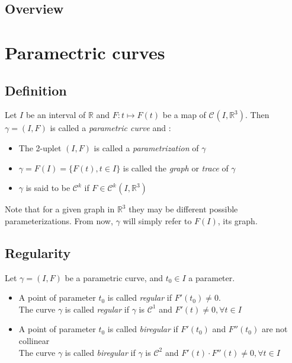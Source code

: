 \citet{Bishop1975}
\citep{Bishop1975}
\citeauthor{Bishop1975}
\citeyear{Bishop1975}

\cite{Bishop1975}
\cite{Bergou2008}
\cite{Hoffmann2008}
\cite{Bluth2014}
\cite{Frenet1852}
\cite{Delcourt2007}
\cite{Farouki2014}
\cite{Guggenheimer1989}
\cite{Klok1986}

\subsection{Overview}



\section{Paramectric curves}

\subsection{Definition}
Let $I$ be an interval of $\mathbb{R}$ and $F\colon t \mapsto F(t)$ be a map of ${\mathcal{C}}^{}(I,{\mathbb{R}}^3)$. Then $\gamma=(I,F)$ is called a \emph{parametric curve} and :
\begin{itemize}
	\item The 2-uplet $(I,F)$ is called a \emph{parametrization} of $\gamma$
	\item $\gamma = F(I) = \{F(t), t \in I\}$ is called the \emph{graph} or \emph{trace} of $\gamma$
	\item $\gamma$ is said to be ${\mathcal{C}}^{k}$ if $F \in {\mathcal{C}^{k}}^{}(I,{\mathbb{R}}^3)$
\end{itemize}

\begin{myrk}
Note that for a given graph in ${\mathbb{R}}^3$ they may be different possible parameterizations. From now, $\gamma$ will simply refer to $F(I)$, its graph.
\end{myrk}

\subsection{Regularity}
Let $\gamma=(I,F)$ be a parametric curve, and $t_0 \in I$ a parameter.
\begin{itemize}
	\item A point of parameter $t_0$ is called \emph{regular} if $F'(t_0) \neq 0$.
	\\The curve $\gamma$ is called \emph{regular} if $\gamma$ is $\mathcal{C}^{1}$ and $F'(t) \neq 0, \forall t \in I$
	\item A point of parameter $t_0$ is called \emph{biregular} if $F'(t_0)$ and $F''(t_0)$ are not collinear
	\\The curve $\gamma$ is called \emph{biregular} if $\gamma$ is $\mathcal{C}^{2}$ and  $F'(t)\cdot    F''(t) \neq 0, \forall t \in I$
\end{itemize}

